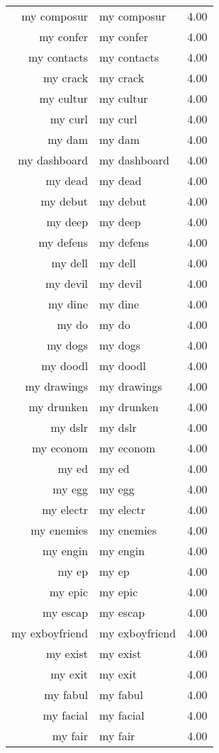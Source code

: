 \begin{table}[ht]
\begin{tabular}{rlr}
  my composur & my composur & 4.00 \\ 
  my confer & my confer & 4.00 \\ 
  my contacts & my contacts & 4.00 \\ 
  my crack & my crack & 4.00 \\ 
  my cultur & my cultur & 4.00 \\ 
  my curl & my curl & 4.00 \\ 
  my dam & my dam & 4.00 \\ 
  my dashboard & my dashboard & 4.00 \\ 
  my dead & my dead & 4.00 \\ 
  my debut & my debut & 4.00 \\ 
  my deep & my deep & 4.00 \\ 
  my defens & my defens & 4.00 \\ 
  my dell & my dell & 4.00 \\ 
  my devil & my devil & 4.00 \\ 
  my dine & my dine & 4.00 \\ 
  my do & my do & 4.00 \\ 
  my dogs & my dogs & 4.00 \\ 
  my doodl & my doodl & 4.00 \\ 
  my drawings & my drawings & 4.00 \\ 
  my drunken & my drunken & 4.00 \\ 
  my dslr & my dslr & 4.00 \\ 
  my econom & my econom & 4.00 \\ 
  my ed & my ed & 4.00 \\ 
  my egg & my egg & 4.00 \\ 
  my electr & my electr & 4.00 \\ 
  my enemies & my enemies & 4.00 \\ 
  my engin & my engin & 4.00 \\ 
  my ep & my ep & 4.00 \\ 
  my epic & my epic & 4.00 \\ 
  my escap & my escap & 4.00 \\ 
  my exboyfriend & my exboyfriend & 4.00 \\ 
  my exist & my exist & 4.00 \\ 
  my exit & my exit & 4.00 \\ 
  my fabul & my fabul & 4.00 \\ 
  my facial & my facial & 4.00 \\ 
  my fair & my fair & 4.00 \\ 

\end{tabular}
\end{table}
